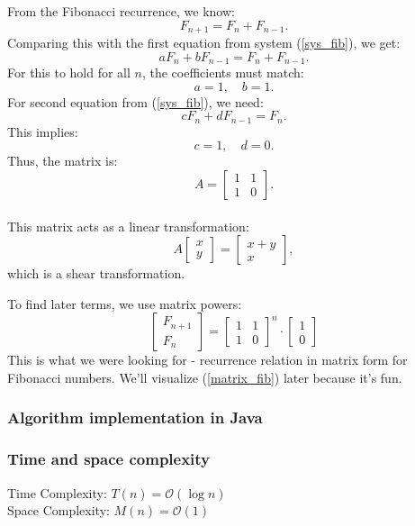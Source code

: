 \documentclass{article}
\begin{document}
From the Fibonacci recurrence, we know:
\[
F_{n+1} = F_n + F_{n-1}.
\]
Comparing this with the first equation from system (\ref{sys_fib}), we get:
\[
a F_n + b F_{n-1} = F_n + F_{n-1}.
\]
For this to hold for all \( n \), the coefficients must match:
\[
a = 1, \quad b = 1.
\]
For second equation from (\ref{sys_fib}), we need:
\[
c F_n + d F_{n-1} = F_n.
\]
This implies:
\[
c = 1, \quad d = 0.
\]
Thus, the matrix is:
\[
A = \begin{bmatrix} 1 & 1 \\ 1 & 0 \end{bmatrix}.
\]
\\
This matrix acts as a linear transformation:
\[
A \begin{bmatrix} x \\ y \end{bmatrix} = \begin{bmatrix} x + y \\ x \end{bmatrix},
\]
which is a shear transformation. 

To find later terms, we use matrix powers:
\begin{equation}
	\begin{bmatrix} F_{n+1} \\ F_n \end{bmatrix} = \begin{bmatrix} 1 & 1 \\ 1 & 0 \end{bmatrix}^n \cdot \begin{bmatrix} 1 \\ 0 \end{bmatrix}
	\label{matrix_fib}
\end{equation}
This is what we were looking for - recurrence relation in matrix form for Fibonacci numbers. We'll visualize (\ref{matrix_fib}) later because it's fun.

\subsubsection{Algorithm implementation in Java}


\subsubsection{Time and space complexity}
Time Complexity: $T(n) = \mathcal{O}(\log n)$ \\
Space Complexity: $M(n) = \mathcal{O}(1)$
\end{document}
